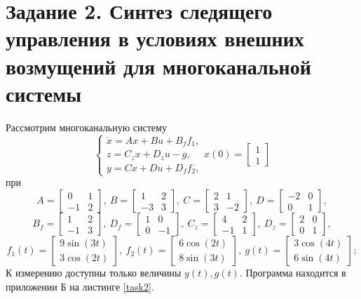 \documentclass[a4paper, 12pt]{article}
\begin{document}
    \section{Задание 2. Синтез следящего управления в условиях внешних возмущений для многоканальной системы}
    Рассмотрим многоканальную систему
    $$
    \begin{cases}
        \dot{x}=Ax+Bu+B_ff_1,\\
        z=C_zx+D_zu-g,\\
        y=Cx+Du+D_ff_2,
    \end{cases} x(0)=\begin{bmatrix}
        1\\1
    \end{bmatrix}
    $$
    при
    $$
    A=\begin{bmatrix}
        0 &1\\
        -1 &2
    \end{bmatrix},\ B=\begin{bmatrix}
        1 &2\\
        -3 &3
    \end{bmatrix},\ C=\begin{bmatrix}
        2 &1\\
        3 &-2
    \end{bmatrix},\ D=\begin{bmatrix}
        -2 &0\\
        0 &1
    \end{bmatrix},
    $$
    $$
    B_f=\begin{bmatrix}
        1 &2\\
        -1 &3
    \end{bmatrix},\ D_f=\begin{bmatrix}
        1 &0\\
        0 &-1
    \end{bmatrix},\ C_z=\begin{bmatrix}
        4 &2\\
        -1 &1
    \end{bmatrix},\ D_z=\begin{bmatrix}
        2 &0\\
        0 &1
    \end{bmatrix},
    $$
    $$
    f_1(t)=\begin{bmatrix}
        9\sin\left( 3t \right)\\
        3\cos\left( 2t \right)
    \end{bmatrix},\ f_2(t)=\begin{bmatrix}
        6\cos\left( 2t \right)\\
        8\sin\left( 3t \right)
    \end{bmatrix},\ g(t)=\begin{bmatrix}
        3\cos\left( 4t \right)\\
        6\sin\left( 4t \right)
    \end{bmatrix};
    $$
    К измерению доступны только величины $y(t),g(t)$. Программа находится в приложении Б на листинге \ref{task2}.
\end{document}
